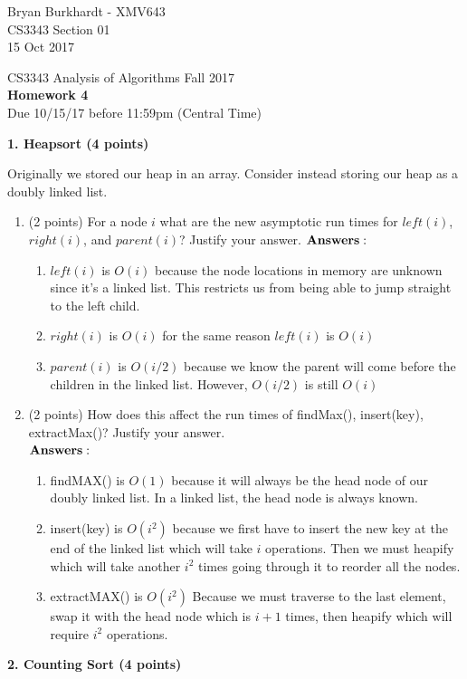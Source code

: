 \documentclass[12pt]{elsart}
\begin{document}
Bryan Burkhardt - XMV643\\
CS3343 Section 01\\
15 Oct 2017\\

\pagestyle{empty}

\begin{center}
\Large  CS3343 Analysis of Algorithms Fall 2017 \\
\large {\bf Homework 4}\\
\normalsize Due 10/15/17 before 11:59pm (Central Time)
\end{center}

{\bf 1.  Heapsort (4 points)}

Originally we stored our heap in an array.  Consider instead storing our heap as a doubly linked list.  

\begin{enumerate}
   \item (2 points) For a node $i$ what are the new asymptotic run times for  $left(i)$, $right(i)$, and $parent(i)$?  Justify your answer.
$\bf{Answers:}$
	\begin{enumerate}
	\item $left(i)$ is $O(i)$ because the node locations in memory are unknown since it's a linked list. This restricts us from being able to jump straight to the left child.
	\item $right(i)$ is $O(i)$ for the same reason $left(i)$ is $O(i)$
	\item $parent(i)$ is $O(i/2)$ because we know the parent will come before the children in the linked list. However, $O(i/2)$ is still $O(i)$\\
	\end{enumerate}

  \item (2 points) How does this affect the run times of findMax(), insert(key), extractMax()?  Justify your answer.\\
	$\bf{Answers:}$
	\begin{enumerate}
	\item findMAX() is $O(1)$ because it will always be the head node of our doubly linked list. In a linked list, the head node is always known.
	\item insert(key) is $O(i^2)$ because we first have to insert the new key at the end of the linked list which will take $i$ operations. Then we must heapify which will take another $i^2$ times going through it to reorder all the nodes.
	\item extractMAX() is $O(i^2)$ Because we must traverse to the last element, swap it with the head node which is $i+1$ times, then heapify which will require $i^2$ operations.
	\end{enumerate}
\end{enumerate}
\newpage
{\bf 2.  Counting Sort (4 points)}
\end{document}
